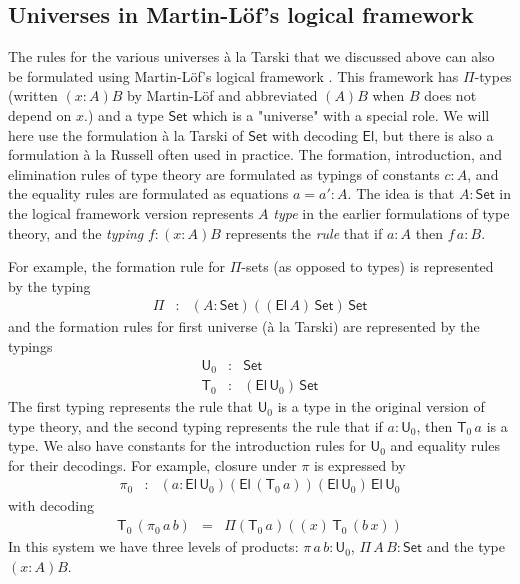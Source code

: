 \documentclass[11pt,a4paper]{article}
\def\UU{\mathsf{U}}
\newcommand{\Set}{\mathsf{Set}}
\newcommand{\El}{\mathsf{El}}
\newcommand{\T}{\mathsf{T}}
\begin{document}
\subsection{Universes in Martin-Löf's logical framework}

The rules for the various universes \`a la Tarski that we discussed above can also be formulated using Martin-Löf's logical framework \cite{Martinlof86,NordstromPS90}. This framework has $\Pi$-types (written $(x : A)B$ by Martin-Löf and abbreviated $(A)B$ when $B$ does not depend on $x$.) and a type $\Set$ which is a "universe" with a special role. We will here use the formulation \`a la Tarski of $\Set$ with decoding $\El$, but there is also a formulation \`a la Russell often used in practice. The formation, introduction, and elimination rules of type theory are formulated as typings of constants $c : A$, and the equality rules are formulated as equations $a = a' : A$. The idea is that $A : \Set$ in the logical framework version represents $A$ {\em type} in the earlier formulations of type theory, and the {\em typing} $f : (x : A)B$ represents the {\em rule} that if $a : A$ then $f\,a : B$.

For example, the formation rule for $\Pi$-sets (as opposed to types) is represented by the typing
\begin{eqnarray*}
\Pi &:& (A:\Set)((\El\,A)\,\Set)\,\Set
\end{eqnarray*}
and the formation rules for first universe (\`a la Tarski) are represented by the typings
\begin{eqnarray*}
\UU_0 &: &\Set\\
\T_0 &:& (\El\,\UU_0)\,\Set
\end{eqnarray*}
The first typing represents the rule that $\UU_0$ is a type in the original version of type theory, and the second typing represents the rule that if $a : \UU_0$, then $\T_0\,a$ is a type. We also have constants for the introduction rules for $\UU_0$ and equality rules for their decodings. For example, closure under $\pi$ is expressed by
\begin{eqnarray*}
\pi_0 &:& (a:\El\, \UU_0)(\El\, (\T_0\, a))(\El\, \UU_0)\,\El\, \UU_0
\end{eqnarray*}
with decoding
\begin{eqnarray*}
\T_0\, (\pi_0\, a\, b) &=& \Pi (\T_0\, a) ((x)\,\T_0\, (b\, x))
\end{eqnarray*}
In this system we have three levels of products: $\pi\,a\,b : \UU_0$, $\Pi\,A\,B : \Set$ and the type $(x : A)B$.
%
%
%
\end{document}

